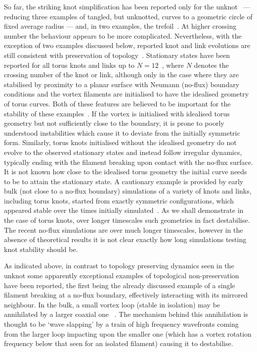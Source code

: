 So far, the striking knot simplification has been reported only for the unknot~\citep{Maucher2016} --- reducing three examples of tangled, but unknotted, curves to a geometric circle of fixed average radius --- and, in two examples, the trefoil~\citep{Sutcliffe2003,Maucher2016}. At higher crossing number the behaviour appears to be more complicated. Nevertheless, with the exception of two examples discussed below, reported knot and link evolutions are still consistent with preservation of topology~\citep{Henze1993, Winfree1990, WinfreeChapter, Sutcliffe2003,Maucher2016,Maucher2017, Maucher2019}. Stationary states have been reported for all torus knots and links up to $N=12$~\citep{Maucher2017,Maucher2019}, where $N$ denotes the crossing number of the knot or link, although only in the case where they are stabilised by proximity to a planar surface with Neumann (no-flux) boundary conditions and the vortex filaments are initialised to have the idealised geometry of torus curves. Both of these features are believed to be important for the stability of these examples~\citep{Maucher2017,Maucher2019}. If the vortex is initialised with idealised torus geometry but not sufficiently close to the boundary, it is prone to poorly understood instabilities which cause it to deviate from the initially symmetric form. Similarly, torus knots initialised without the idealised geometry do not evolve to the observed stationary states and instead follow irregular dynamics, typically ending with the filament breaking upon contact with the no-flux surface. It is not known how close to the idealised torus geometry the initial curve needs to be to attain the stationary state. A cautionary example is provided by early bulk (not close to a no-flux boundary) simulations of a variety of knots and links, including torus knots, started from exactly symmetric configurations, which appeared stable over the times initially simulated~\citep{Henze1993}. As we shall demonstrate in the case of torus knots, over longer timescales such geometries in fact destabilise. The recent no-flux simulations are over much longer timescales, however in the absence of theoretical results it is not clear exactly how long simulations testing knot stability should be.

As indicated above, in contrast to topology preserving dynamics seen in the unknot some apparently exceptional examples of topological non-preservation have been reported, the first being the already discussed example of a single filament breaking at a no-flux boundary, effectively interacting with its mirrored neighbour. In the bulk, a small vortex loop (stable in isolation) may be annihilated by a larger coaxial one ~\citep{Courtemanche1990,Maucher2018}. The mechanism behind this annihilation is thought to be `wave slapping' by a train of high frequency wavefronts coming from the larger loop impacting upon the smaller one (which has a vortex rotation frequency below that seen for an isolated filament) causing it to destabilise.

